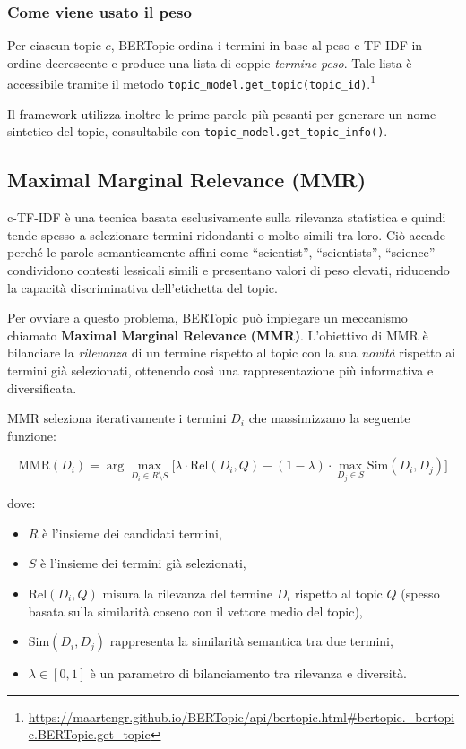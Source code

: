 \subsubsection{Come viene usato il peso}
Per ciascun topic \(c\), BERTopic ordina i termini in base al peso c-TF-IDF in ordine decrescente e produce una lista di coppie \textit{termine}-\textit{peso}. Tale lista è accessibile tramite il metodo \texttt{topic\_model.get\_topic(topic\_id)}.\footnote{\url{https://maartengr.github.io/BERTopic/api/bertopic.html\#bertopic._bertopic.BERTopic.get_topic}}

\noindent Il framework utilizza inoltre le prime parole più pesanti per generare un nome sintetico del topic, consultabile con \texttt{topic\_model.get\_topic\_info()}.
\subsection{Maximal Marginal Relevance (MMR)}
c-TF-IDF è una tecnica basata esclusivamente sulla rilevanza statistica e quindi tende spesso a selezionare termini ridondanti o molto simili tra loro. Ciò accade perché le parole semanticamente affini come “scientist”, “scientists”, “science” condividono contesti lessicali simili e presentano valori di peso elevati, riducendo la capacità discriminativa dell’etichetta del topic.

Per ovviare a questo problema, BERTopic può impiegare un meccanismo chiamato \textbf{Maximal Marginal Relevance (MMR)}. L’obiettivo di MMR è bilanciare la \textit{rilevanza} di un termine rispetto al topic con la sua \textit{novità} rispetto ai termini già selezionati, ottenendo così una rappresentazione più informativa e diversificata.

MMR seleziona iterativamente i termini $D_i$ che massimizzano la seguente funzione:

\[
\text{MMR}(D_i) = \arg\max_{D_i \in R \setminus S}
\Big[
\lambda \cdot \text{Rel}(D_i, Q)
- (1 - \lambda) \cdot \max_{D_j \in S} \text{Sim}(D_i, D_j)
\Big]
\]

dove:
\begin{itemize}
    \item $R$ è l’insieme dei candidati termini,
    \item $S$ è l’insieme dei termini già selezionati,
    \item $\text{Rel}(D_i, Q)$ misura la rilevanza del termine $D_i$ rispetto al topic $Q$ (spesso basata sulla similarità coseno con il vettore medio del topic),
    \item $\text{Sim}(D_i, D_j)$ rappresenta la similarità semantica tra due termini,
    \item $\lambda \in [0,1]$ è un parametro di bilanciamento tra rilevanza e diversità.
\end{itemize}

